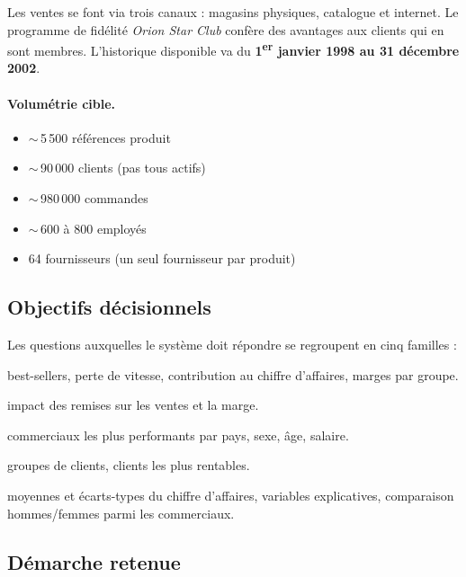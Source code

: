 \documentclass[11pt,a4paper]{article}
\newcounter{question}
\begin{document}
Les ventes se font via trois canaux : magasins physiques, catalogue et
internet. Le programme de fidélité \emph{Orion Star Club} confère des
avantages aux clients qui en sont membres. L'historique disponible va du
\textbf{1\textsuperscript{er} janvier 1998 au 31 décembre 2002}.

\paragraph{Volumétrie cible.}
\begin{itemize}
  \item $\sim$\,5\,500 références produit
  \item $\sim$\,90\,000 clients (pas tous actifs)
  \item $\sim$\,980\,000 commandes
  \item $\sim$\,600 à 800 employés
  \item 64 fournisseurs (un seul fournisseur par produit)
\end{itemize}

\subsection{Objectifs décisionnels}

Les questions auxquelles le système doit répondre se regroupent en cinq
familles :
\begin{description}[style=nextline,leftmargin=1.4cm]
  \item[Performance produit] best-sellers, perte de vitesse, contribution au
    chiffre d'affaires, marges par groupe.
  \item[Effet remise] impact des remises sur les ventes et la marge.
  \item[Performance commerciale] commerciaux les plus performants par pays,
    sexe, âge, salaire.
  \item[Segmentation client] groupes de clients, clients les plus rentables.
  \item[Analyses statistiques] moyennes et écarts-types du chiffre d'affaires,
    variables explicatives, comparaison hommes/femmes parmi les commerciaux.
\end{description}

\subsection{Démarche retenue}
\end{document}
